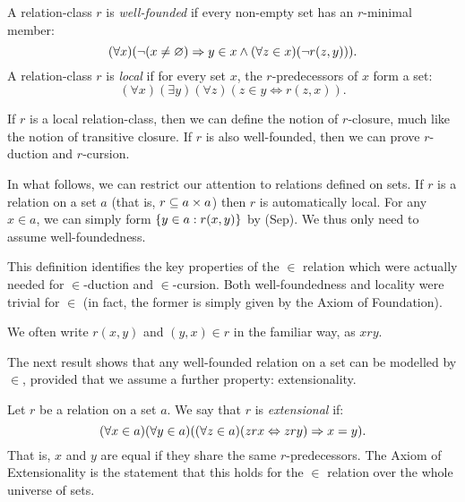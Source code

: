 \documentclass{article}
\begin{document}
\begin{definition}
    A relation-class $r$ is \textit{well-founded} if every non-empty set has an $r$-minimal member:
    \[
	(\forall x)
	(\lnot (x \neq \varnothing) \Rightarrow y \in x \land (\forall z \in x)(\lnot r(z, y))).
	\]
	A relation-class $r$ is \textit{local} if for every set $x$, the $r$-predecessors of $x$ form a set:
	\[
	(\forall x)(\exists y)(\forall z)(z \in y \Leftrightarrow r(z, x)).
	\]
\end{definition}

\begin{corollary}
    If $r$ is a local relation-class, then we can define the notion of $r$-closure, much like the notion of transitive closure. If $r$ is also well-founded, then we can prove $r$-duction and $r$-cursion.
\end{corollary}

\begin{corollary}
    In what follows, we can restrict our attention to relations defined on sets. If $r$ is a relation on a set $a$ (that is, $r \subseteq a \times a$) then $r$ is automatically local. For any $x \in a$, we can simply form $\left\lbrace y \in a : r(x, y) \right\rbrace$ by (Sep). We thus only need to assume well-foundedness.
\end{corollary}

\begin{note}
	This definition identifies the key properties of the $\in$ relation which were actually needed for $\in$-duction and $\in$-cursion. Both well-foundedness and locality were trivial for $\in$ (in fact, the former is simply given by the Axiom of Foundation).
\end{note}

\begin{note}
	We often write $r(x, y)$ and $(y, x) \in r$ in the familiar way, as $xry$.
\end{note}

The next result shows that any well-founded relation on a set can be modelled by $\in$, provided that we assume a further property: extensionality.

\begin{definition}[Extensional]
    Let $r$ be a relation on a set $a$. We say that $r$ is \textit{extensional} if:
    \[
	(\forall x \in a)(\forall y \in a)
	((\forall z \in a)(zrx \Leftrightarrow zry) \Rightarrow x = y).
	\]
	That is, $x$ and $y$ are equal if they share the same $r$-predecessors. The Axiom of Extensionality is the statement that this holds for the $\in$ relation over the whole universe of sets. 
\end{definition}
\end{document}
